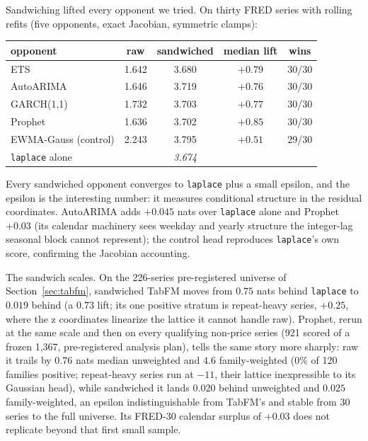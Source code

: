 \documentclass[article]{jss}
\providecommand{\code}[1]{\texttt{#1}}
\begin{document}
Sandwiching lifted every opponent we tried. On thirty FRED series with
rolling refits (five opponents, exact Jacobian, symmetric clamps):

\begin{center}
\begin{tabular}{lcccc}
\hline
opponent & raw & sandwiched & median lift & wins \\
\hline
ETS               & 1.642 & 3.680 & $+0.79$ & 30/30 \\
AutoARIMA         & 1.646 & 3.719 & $+0.76$ & 30/30 \\
GARCH(1,1)        & 1.732 & 3.703 & $+0.77$ & 30/30 \\
Prophet           & 1.636 & 3.702 & $+0.85$ & 30/30 \\
EWMA-Gauss (control) & 2.243 & 3.795 & $+0.51$ & 29/30 \\
\code{laplace} alone & & \emph{3.674} & & \\
\hline
\end{tabular}
\end{center}

Every sandwiched opponent converges to \code{laplace} plus a small
epsilon, and the epsilon is the interesting number: it measures
conditional structure in the residual coordinates. AutoARIMA adds
$+0.045$ nats over \code{laplace} alone and Prophet $+0.03$ (its
calendar machinery sees weekday and yearly structure the integer-lag
seasonal block cannot represent); the control head reproduces
\code{laplace}'s own score, confirming the Jacobian accounting.

The sandwich scales. On the 226-series pre-registered universe of
Section~\ref{sec:tabfm}, sandwiched TabFM moves from $0.75$ nats behind
\code{laplace} to $0.019$ behind (a $0.73$ lift; its one positive
stratum is repeat-heavy series, $+0.25$, where the z coordinates
linearize the lattice it cannot handle raw). Prophet, rerun at the same
scale and then on every qualifying non-price series (921 scored of a
frozen 1,367, pre-registered analysis plan), tells the same story more
sharply: raw it trails by $0.76$ nats median unweighted and $4.6$
family-weighted (0\% of 120 families positive; repeat-heavy series run
at $-11$, their lattice inexpressible to its Gaussian head), while
sandwiched it lands $0.020$ behind unweighted and $0.025$
family-weighted, an epsilon indistinguishable from TabFM's and stable
from 30 series to the full universe. Its FRED-30 calendar surplus of
$+0.03$ does not replicate beyond that first small sample.
\end{document}
